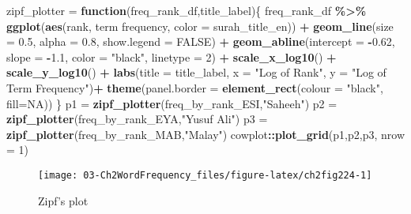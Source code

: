 \documentclass[
]{article}
\newenvironment{Shaded}{\begin{snugshade}}{\end{snugshade}}
\newcommand{\AttributeTok}[1]{\textcolor[rgb]{0.13,0.29,0.53}{#1}}
\newcommand{\ConstantTok}[1]{\textcolor[rgb]{0.56,0.35,0.01}{#1}}
\newcommand{\ControlFlowTok}[1]{\textcolor[rgb]{0.13,0.29,0.53}{\textbf{#1}}}
\newcommand{\DecValTok}[1]{\textcolor[rgb]{0.00,0.00,0.81}{#1}}
\newcommand{\FloatTok}[1]{\textcolor[rgb]{0.00,0.00,0.81}{#1}}
\newcommand{\FunctionTok}[1]{\textcolor[rgb]{0.13,0.29,0.53}{\textbf{#1}}}
\newcommand{\NormalTok}[1]{#1}
\newcommand{\OtherTok}[1]{\textcolor[rgb]{0.56,0.35,0.01}{#1}}
\newcommand{\SpecialCharTok}[1]{\textcolor[rgb]{0.81,0.36,0.00}{\textbf{#1}}}
\newcommand{\StringTok}[1]{\textcolor[rgb]{0.31,0.60,0.02}{#1}}
\begin{document}
\begin{Shaded}
\begin{Highlighting}[]
\NormalTok{zipf\_plotter }\OtherTok{=} \ControlFlowTok{function}\NormalTok{(freq\_rank\_df,title\_label)\{}
\NormalTok{  freq\_rank\_df }\SpecialCharTok{\%\textgreater{}\%} 
  \FunctionTok{ggplot}\NormalTok{(}\FunctionTok{aes}\NormalTok{(rank, }\StringTok{\textasciigrave{}}\AttributeTok{term frequency}\StringTok{\textasciigrave{}}\NormalTok{, }\AttributeTok{color =}\NormalTok{ surah\_title\_en)) }\SpecialCharTok{+} 
  \FunctionTok{geom\_line}\NormalTok{(}\AttributeTok{size =} \FloatTok{0.5}\NormalTok{, }\AttributeTok{alpha =} \FloatTok{0.8}\NormalTok{, }\AttributeTok{show.legend =} \ConstantTok{FALSE}\NormalTok{) }\SpecialCharTok{+} 
  \FunctionTok{geom\_abline}\NormalTok{(}\AttributeTok{intercept =} \SpecialCharTok{{-}}\FloatTok{0.62}\NormalTok{, }\AttributeTok{slope =} \SpecialCharTok{{-}}\FloatTok{1.1}\NormalTok{, }
              \AttributeTok{color =} \StringTok{"black"}\NormalTok{, }\AttributeTok{linetype =} \DecValTok{2}\NormalTok{) }\SpecialCharTok{+}
  \FunctionTok{scale\_x\_log10}\NormalTok{() }\SpecialCharTok{+}
  \FunctionTok{scale\_y\_log10}\NormalTok{() }\SpecialCharTok{+} 
  \FunctionTok{labs}\NormalTok{(}\AttributeTok{title =}\NormalTok{ title\_label, }
       \AttributeTok{x =} \StringTok{"Log of Rank"}\NormalTok{, }
       \AttributeTok{y =} \StringTok{"Log of Term Frequency"}\NormalTok{)}\SpecialCharTok{+}
    \FunctionTok{theme}\NormalTok{(}\AttributeTok{panel.border =} \FunctionTok{element\_rect}\NormalTok{(}\AttributeTok{colour =} \StringTok{"black"}\NormalTok{, }\AttributeTok{fill=}\ConstantTok{NA}\NormalTok{))}
\NormalTok{\}}
\NormalTok{p1 }\OtherTok{=} \FunctionTok{zipf\_plotter}\NormalTok{(freq\_by\_rank\_ESI,}\StringTok{"Saheeh"}\NormalTok{)}
\NormalTok{p2 }\OtherTok{=} \FunctionTok{zipf\_plotter}\NormalTok{(freq\_by\_rank\_EYA,}\StringTok{"Yusuf Ali"}\NormalTok{)}
\NormalTok{p3 }\OtherTok{=} \FunctionTok{zipf\_plotter}\NormalTok{(freq\_by\_rank\_MAB,}\StringTok{"Malay"}\NormalTok{)}
\NormalTok{cowplot}\SpecialCharTok{::}\FunctionTok{plot\_grid}\NormalTok{(p1,p2,p3, }\AttributeTok{nrow =} \DecValTok{1}\NormalTok{)}
\end{Highlighting}
\end{Shaded}

\begin{figure}

{\centering \texttt{[image: 03-Ch2WordFrequency\_files/figure-latex/ch2fig224-1]} 

}

\caption{Zipf's plot}\label{fig:ch2fig224}
\end{figure}
\end{document}
